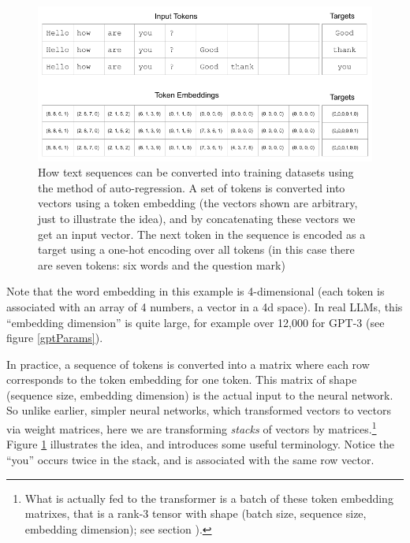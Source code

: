 \begin{figure}[h]
\centering
\includegraphics[scale=.45]{./images/contextWindow.png}
\caption[Jeff Yoshimi]{How text sequences can be converted into training datasets using the method of auto-regression. A set of tokens is converted into vectors using a token embedding (the vectors shown are arbitrary, just to illustrate the idea), and by concatenating these vectors we get an input vector. The next token in the sequence is encoded as a target using a one-hot encoding over all tokens (in this case there are seven tokens: six words and the question mark)}
\label{nextWordPrediction}
\end{figure}

Note that the word embedding in this example is 4-dimensional (each token is associated with an array of 4 numbers, a vector in a 4d space). In real LLMs, this ``embedding dimension'' is quite large, for example over 12,000 for GPT-3 (see figure \ref{gptParams}). 

In practice, a sequence of tokens is converted into a matrix where each row corresponds to the token embedding for one token. This matrix of shape (sequence size, embedding dimension) is the actual input to the neural network. So unlike earlier, simpler neural networks, which transformed vectors to vectors via weight matrices, here we are transforming \emph{stacks} of vectors by matrices.\footnote{What is actually fed to the transformer is a batch of these token embedding matrixes, that is a rank-3 tensor with shape (batch size, sequence size, embedding dimension); see section ).}  Figure \ref{nextWordPrediction} illustrates the idea, and introduces some useful terminology. Notice the ``you'' occurs twice in the stack, and is associated with the same row vector.

